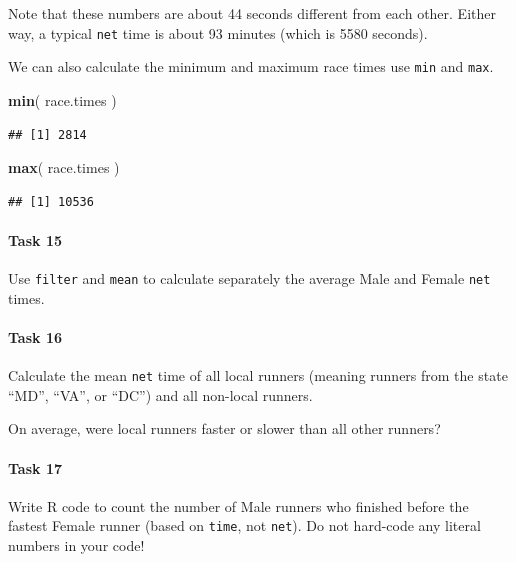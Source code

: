 \documentclass[
]{article}
\newenvironment{Shaded}{\begin{snugshade}}{\end{snugshade}}
\newcommand{\FunctionTok}[1]{\textcolor[rgb]{0.13,0.29,0.53}{\textbf{#1}}}
\newcommand{\NormalTok}[1]{#1}
\begin{document}
Note that these numbers are about 44 seconds different from each other.
Either way, a typical \texttt{net} time is about 93 minutes (which is
5580 seconds).

We can also calculate the minimum and maximum race times use
\texttt{min} and \texttt{max}.

\begin{Shaded}
\begin{Highlighting}[]
\FunctionTok{min}\NormalTok{( race.times ) }
\end{Highlighting}
\end{Shaded}

\begin{verbatim}
## [1] 2814
\end{verbatim}

\begin{Shaded}
\begin{Highlighting}[]
\FunctionTok{max}\NormalTok{( race.times )}
\end{Highlighting}
\end{Shaded}

\begin{verbatim}
## [1] 10536
\end{verbatim}

\paragraph{Task 15}\label{task-15}

Use \texttt{filter} and \texttt{mean} to calculate separately the
average Male and Female \texttt{net} times.

\paragraph{Task 16}\label{task-16}

Calculate the mean \texttt{net} time of all local runners (meaning
runners from the state ``MD'', ``VA'', or ``DC'') and all non-local
runners.

On average, were local runners faster or slower than all other runners?

\paragraph{Task 17}\label{task-17}

Write R code to count the number of Male runners who finished before the
fastest Female runner (based on \texttt{time}, not \texttt{net}). Do not
hard-code any literal numbers in your code!
\end{document}
